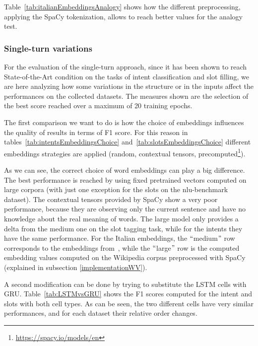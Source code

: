 Table~\ref{tab:italianEmbeddingsAnalogy} shows how the different preprocessing, applying the SpaCy tokenization, allows to reach better values for the analogy test.

\subsubsection{Single-turn variations}
For the evaluation of the single-turn approach, since it has been shown to reach State-of-the-Art condition on the tasks of intent classification and slot filling, we are here analyzing how some variations in the structure or in the inputs affect the performances on the collected datasets. The measures shown are the selection of the best score reached over a maximum of 20 training epochs.

The first comparison we want to do is how the choice of embeddings influences the quality of results in terms of F1 score. For this reason in tables~\ref{tab:intentsEmbeddingsChoice} and~\ref{tab:slotsEmbeddingsChoice} different embeddings strategies are applied (random, contextual tensors, precomputed\footnote{\url{https://spacy.io/models/en}}).







As we can see, the correct choice of word embeddings can play a big difference. The best performance is reached by using fixed pretrained vectors computed on large corpora (with just one exception for the slots on the nlu-benchmark dataset). The contextual tensors provided by SpaCy show a very poor performance, because they are observing only the current sentence and have no knowledge about the real meaning of words. The large model only provides a delta from the medium one on the slot tagging task, while for the intents they have the same performance. For the Italian embeddings, the $``$medium$"$  row corresponds to the embeddings from~\cite{berardi2015word}, while the $``$large$"$  row is the computed embedding values computed on the Wikipedia corpus preprocessed with SpaCy (explained in subsection \ref{implementationWV}).

A second modification can be done by trying to substitute the LSTM cells with GRU. Table~\ref{tab:LSTMvsGRU} shows the F1 scores computed for the intent and slots with both cell types. As can be seen, the two different cells have very similar performances, and for each dataset their relative order changes.

